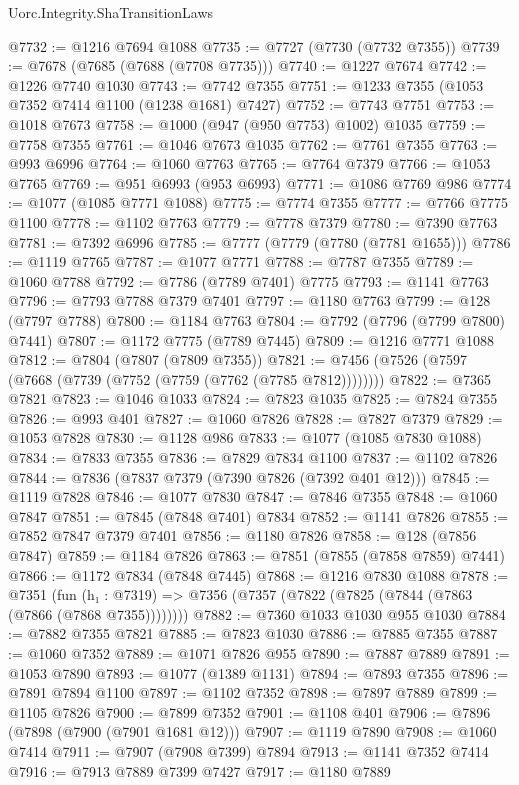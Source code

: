 \begin{lexlean}{Uorc.Integrity.ShaTransitionLaws}
\begin{coremodule}
@7732 := @1216 @7694 @1088
@7735 := @7727 (@7730 (@7732 @7355))
@7739 := @7678 (@7685 (@7688 (@7708 @7735)))
@7740 := @1227 @7674
@7742 := @1226 @7740 @1030
@7743 := @7742 @7355
@7751 := @1233 @7355 (@1053 @7352 @7414 @1100 (@1238 @1681) @7427)
@7752 := @7743 @7751
@7753 := @1018 @7673
@7758 := @1000 (@947 (@950 @7753) @1002) @1035
@7759 := @7758 @7355
@7761 := @1046 @7673 @1035
@7762 := @7761 @7355
@7763 := @993 @6996
@7764 := @1060 @7763
@7765 := @7764 @7379
@7766 := @1053 @7765
@7769 := @951 @6993 (@953 @6993)
@7771 := @1086 @7769 @986
@7774 := @1077 (@1085 @7771 @1088)
@7775 := @7774 @7355
@7777 := @7766 @7775 @1100
@7778 := @1102 @7763
@7779 := @7778 @7379
@7780 := @7390 @7763
@7781 := @7392 @6996
@7785 := @7777 (@7779 (@7780 (@7781 @1655)))
@7786 := @1119 @7765
@7787 := @1077 @7771
@7788 := @7787 @7355
@7789 := @1060 @7788
@7792 := @7786 (@7789 @7401) @7775
@7793 := @1141 @7763
@7796 := @7793 @7788 @7379 @7401
@7797 := @1180 @7763
@7799 := @128 (@7797 @7788)
@7800 := @1184 @7763
@7804 := @7792 (@7796 (@7799 @7800) @7441)
@7807 := @1172 @7775 (@7789 @7445)
@7809 := @1216 @7771 @1088
@7812 := @7804 (@7807 (@7809 @7355))
@7821 := @7456 (@7526 (@7597 (@7668 (@7739 (@7752 (@7759 (@7762 (@7785 @7812))))))))
@7822 := @7365 @7821
@7823 := @1046 @1033
@7824 := @7823 @1035
@7825 := @7824 @7355
@7826 := @993 @401
@7827 := @1060 @7826
@7828 := @7827 @7379
@7829 := @1053 @7828
@7830 := @1128 @986
@7833 := @1077 (@1085 @7830 @1088)
@7834 := @7833 @7355
@7836 := @7829 @7834 @1100
@7837 := @1102 @7826
@7844 := @7836 (@7837 @7379 (@7390 @7826 (@7392 @401 @12)))
@7845 := @1119 @7828
@7846 := @1077 @7830
@7847 := @7846 @7355
@7848 := @1060 @7847
@7851 := @7845 (@7848 @7401) @7834
@7852 := @1141 @7826
@7855 := @7852 @7847 @7379 @7401
@7856 := @1180 @7826
@7858 := @128 (@7856 @7847)
@7859 := @1184 @7826
@7863 := @7851 (@7855 (@7858 @7859) @7441)
@7866 := @1172 @7834 (@7848 @7445)
@7868 := @1216 @7830 @1088
@7878 := @7351
    (fun (h₁ : @7319) => @7356 (@7357 (@7822 (@7825 (@7844 (@7863 (@7866 (@7868 @7355))))))))
@7882 := @7360 @1033 @1030 @955 @1030
@7884 := @7882 @7355 @7821
@7885 := @7823 @1030
@7886 := @7885 @7355
@7887 := @1060 @7352
@7889 := @1071 @7826 @955
@7890 := @7887 @7889
@7891 := @1053 @7890
@7893 := @1077 (@1389 @1131)
@7894 := @7893 @7355
@7896 := @7891 @7894 @1100
@7897 := @1102 @7352
@7898 := @7897 @7889
@7899 := @1105 @7826
@7900 := @7899 @7352
@7901 := @1108 @401
@7906 := @7896 (@7898 (@7900 (@7901 @1681 @12)))
@7907 := @1119 @7890
@7908 := @1060 @7414
@7911 := @7907 (@7908 @7399) @7894
@7913 := @1141 @7352 @7414
@7916 := @7913 @7889 @7399 @7427
@7917 := @1180 @7889

\end{coremodule}
\end{lexlean}
